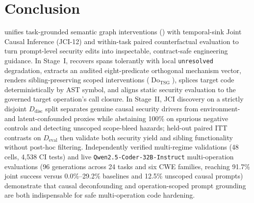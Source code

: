 \section{Conclusion}

\model unifies task-grounded semantic graph interventions (\prompttsg) with
temporal-sink Joint Causal Inference (JCI-12) and within-task paired
counterfactual evaluation to turn prompt-level security edits into inspectable,
contract-safe engineering guidance. In Stage~I, \prompttsg recovers spans
tolerantly with local \texttt{unresolved} degradation, extracts an audited
eight-predicate orthogonal mechanism vector, renders sibling-preserving
scoped interventions ($\operatorname{Do}_{\mathrm{TSG}}$), splices target code
deterministically by AST symbol, and aligns static security evaluation to the
governed target operation's call closure. In Stage~II, JCI discovery on a
strictly disjoint $D_{\mathrm{disc}}$ split separates genuine causal security
drivers from environment- and latent-confounded proxies while abstaining
100\% on spurious negative controls and detecting unscoped scope-bleed hazards;
held-out paired ITT contrasts on $D_{\mathrm{eval}}$ then validate both
security yield and sibling functionality without post-hoc filtering. Independently
verified multi-regime validations (48 cells, 4,538 CI tests) and live
\texttt{Qwen2.5-Coder-32B-Instruct} multi-operation evaluations (96
generations across 24 tasks and six CWE families, reaching 91.7\% joint
success versus 0.0\%--29.2\% baselines and 12.5\% unscoped causal prompts)
demonstrate that causal deconfounding and operation-scoped prompt grounding are
both indispensable for safe multi-operation code hardening.
